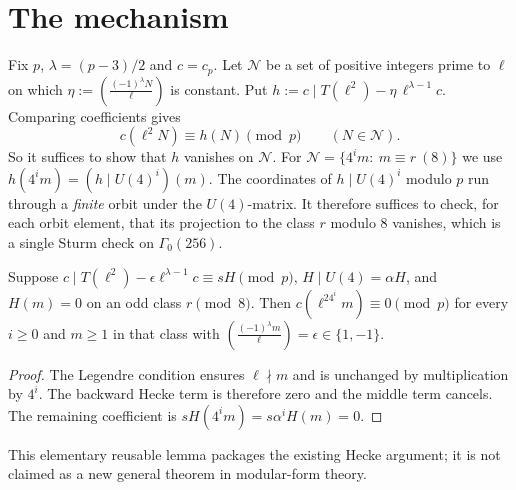 \documentclass[11pt]{article}
\theoremstyle{remark}\newtheorem{remark}[theorem]{Remark}
\newcommand{\leg}[2]{\left(\frac{#1}{#2}\right)}
\begin{document}
\section{The mechanism}
Fix $p$, $\lambda=(p-3)/2$ and $c=c_p$. Let $\mathcal N$ be a set of positive integers prime to $\ell$ on which $\eta:=\leg{(-1)^\lambda N}\ell$ is constant. Put $h:=c\mid T(\ell^2)-\eta\,\ell^{\lambda-1}c$. Comparing coefficients gives
\begin{equation}\label{eq:key}
c(\ell^2N)\equiv h(N)\pmod p\qquad(N\in\mathcal N).
\end{equation}
So it suffices to show that $h$ vanishes on $\mathcal N$. For $\mathcal N=\{4^im:\ m\equiv r\ (8)\}$ we use $h(4^im)=(h\mid U(4)^i)(m)$. The coordinates of $h\mid U(4)^i$ modulo $p$ run through a \emph{finite} orbit under the $U(4)$-matrix. It therefore suffices to check, for each orbit element, that its projection to the class $r$ modulo $8$ vanishes, which is a single Sturm check on $\Gamma_0(256)$.

\begin{lemma}\label{lem:propagation}
Suppose $c\mid T(\ell^2)-\epsilon\ell^{\lambda-1}c\equiv sH\pmod p$, $H\mid U(4)=\alpha H$, and $H(m)=0$ on an odd class $r\pmod8$. Then $c(\ell^24^im)\equiv0\pmod p$ for every $i\ge0$ and $m\ge1$ in that class with $\leg{(-1)^\lambda m}\ell=\epsilon\in\{1,-1\}$.
\end{lemma}
\begin{proof} The Legendre condition ensures $\ell\nmid m$ and is unchanged by multiplication by $4^i$. The backward Hecke term is therefore zero and the middle term cancels. The remaining coefficient is $sH(4^im)=s\alpha^iH(m)=0$.\end{proof}
This elementary reusable lemma packages the existing Hecke argument; it is not claimed as a new general theorem in modular-form theory.
\end{document}
